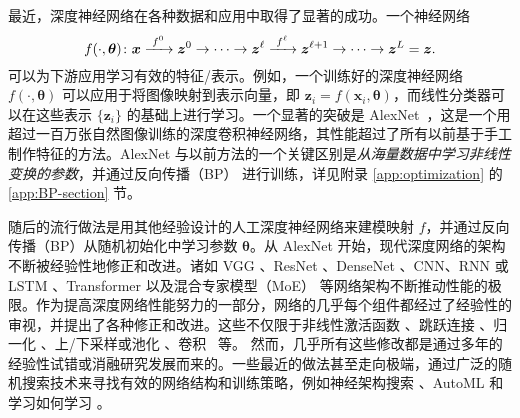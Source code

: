 \documentclass[../../book-main_zh.tex]{subfiles}
\begin{document}
最近，深度神经网络在各种数据和应用中取得了显著的成功。一个神经网络
\begin{equation}
  f(\cdot, \bm \theta) \colon \bm{x}
  \xrightarrow{\hspace{1mm} f^0 \hspace{1mm}} \bm{z}^0 \rightarrow \cdots
  \rightarrow \bm{z}^\ell \xrightarrow{\hspace{1mm} f^\ell \hspace{1mm}}
  \bm{z}^{\ell+1} \rightarrow  \cdots \to \bm{z}^L = \bm{z}.
\end{equation}
可以为下游应用学习有效的特征/表示。例如，一个训练好的深度神经网络 $f(\cdot, \bm \theta)$ 可以应用于将图像映射到表示向量，即 $\bm{z}_i = f(\bm{x}_i,\bm \theta)$，而线性分类器可以在这些表示 $\{\bm{z}_i\}$ 的基础上进行学习。一个显著的突破是 AlexNet~\cite{krizhevsky2012imagenet}，这是一个用超过一百万张自然图像训练的深度卷积神经网络，其性能超过了所有以前基于手工制作特征的方法。AlexNet 与以前方法的一个关键区别是\textit{从海量数据中学习非线性变换的参数}，并通过反向传播（BP）\cite{Back-Prop} 进行训练，详见附录 \ref{app:optimization} 的 \ref{app:BP-section} 节。



随后的流行做法是用其他经验设计的人工深度神经网络来建模映射 $f$，并通过反向传播（BP）从随机初始化中学习参数 $\bm \theta$。从 AlexNet \cite{krizhevsky2012imagenet} 开始，现代深度网络的架构不断被经验性地修正和改进。诸如 VGG \cite{simonyan2014very}、ResNet \cite{he2016deep}、DenseNet \cite{dense-net}、CNN、RNN 或 LSTM \cite{LSTM}、Transformer \cite{vaswani2017attention} 以及混合专家模型（MoE）\cite{MoE,Fedus-2022} 等网络架构不断推动性能的极限。作为提高深度网络性能努力的一部分，网络的几乎每个组件都经过了经验性的审视，并提出了各种修正和改进。这些不仅限于非线性激活函数 \cite{maas2013rectifier,klambauer2017self,xu2015empirical,nwankpa2018activation}、跳跃连接 \cite{ronneberger2015u,he2016deep}、归一化 \cite{ioffe2015batch,ba2016layer,ulyanov2016instance,wu2018group,miyato2018spectral}、上/下采样或池化 \cite{scherer2010evaluation}、卷积~\cite{lecun1998gradient,krizhevsky2012imagenet} 等。
然而，几乎所有这些修改都是通过多年的经验性{试错}或消融研究发展而来的。一些最近的做法甚至走向极端，通过广泛的随机搜索技术来寻找有效的网络结构和训练策略，例如神经架构搜索 \cite{NAS-1,Baker2017DesigningNN}、AutoML \cite{automl} 和学习如何学习 \cite{andrychowicz2016learning}。
\end{document}
